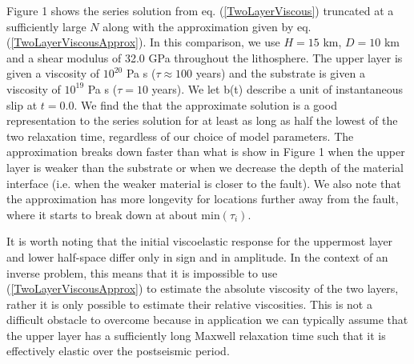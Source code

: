 \documentclass[extra]{gji}
\begin{document}
Figure 1 shows the series solution from eq. (\ref{TwoLayerViscous})
truncated at a sufficiently large $N$ along with the approximation
given by eq. (\ref{TwoLayerViscousApprox}). In this comparison, we use
$H=15$ km, $D=10$ km and a shear modulus of 32.0 GPa throughout the
lithosphere.  The upper layer is given a viscosity of $10^{20}$ Pa s
($\tau\approx 100$ years) and the substrate is given a viscosity of
$10^{19}$ Pa s ($\tau=10$ years).  We let b(t) describe a unit of
instantaneous slip at $t=0.0$.  We find the that the approximate
solution is a good representation to the series solution for at least
as long as half the lowest of the two relaxation time, regardless of
our choice of model parameters.  The approximation breaks down faster
than what is show in Figure 1 when the upper layer is weaker than the
substrate or when we decrease the depth of the material interface
(i.e. when the weaker material is closer to the fault).  We also note
that the approximation has more longevity for locations further away
from the fault, where it starts to break down at about
$\text{min}(\tau_i)$.

It is worth noting that the initial viscoelastic response for the
uppermost layer and lower half-space differ only in sign and in
amplitude.  In the context of an inverse problem, this means that it
is impossible to use (\ref{TwoLayerViscousApprox}) to estimate the
absolute viscosity of the two layers, rather it is only possible to
estimate their relative viscosities.  This is not a difficult obstacle
to overcome because in application we can typically assume that the
upper layer has a sufficiently long Maxwell relaxation time such that
it is effectively elastic over the postseismic period.
\end{document}
